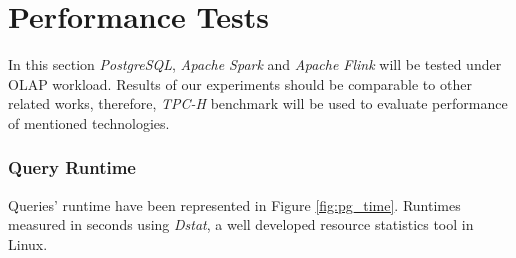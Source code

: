 \documentclass[report.tex]{subfiles}
\begin{document}
\section{Performance Tests}

In this section \textit{PostgreSQL}\cite{postgres}, \textit{Apache Spark}\cite{spark} and \textit{Apache Flink}\cite{flink} will be tested under OLAP workload. Results of our experiments should be comparable to other related works, therefore, \textit{TPC-H}\cite{tpcc} benchmark will be used to evaluate performance of mentioned technologies.

\subsubsection{Query Runtime}
Queries' runtime have been represented in Figure \ref{fig:pg_time}. Runtimes measured in seconds using \textit{Dstat}\cite{dstat}, a well developed resource statistics tool in Linux.


\end{document}
